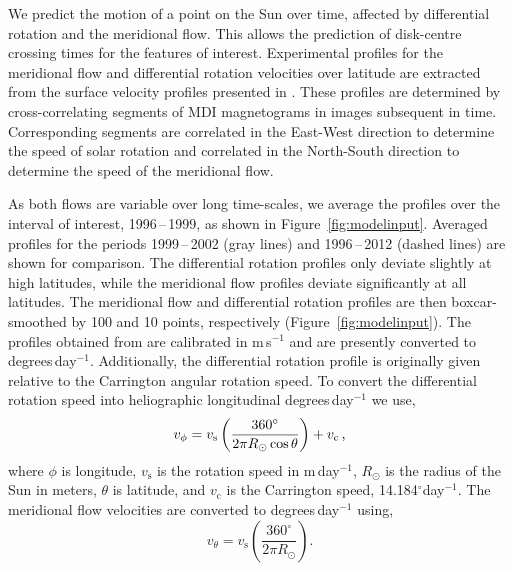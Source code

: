 We predict the motion of a point on the Sun over time, affected by differential rotation and the meridional flow. This allows the prediction of disk-centre crossing times for the features of interest.
Experimental profiles for the meridional flow and differential rotation velocities over latitude are extracted from the surface velocity profiles presented in \cite{Hathaway:2011}. These profiles are determined by cross-correlating segments of MDI magnetograms in images subsequent in time. Corresponding segments are correlated in the East-West direction to determine the speed of solar rotation and correlated in the North-South direction to determine the speed of the meridional flow.

As both flows are variable over long time-scales, we average the profiles over the interval of interest, 1996\,--\,1999, as shown in Figure~\ref{fig:modelinput}. Averaged profiles for the periods 1999\,--\,2002 (gray lines) and 1996\,--\,2012 (dashed lines) are shown for comparison. The differential rotation profiles only deviate slightly at high latitudes, while the meridional flow profiles deviate significantly at all latitudes. The meridional flow and differential rotation profiles are then boxcar-smoothed by 100 and 10 points, respectively (Figure~\ref{fig:modelinput}). The profiles obtained from \cite{Hathaway:2011} are calibrated in m\,s$^{-1}$ and are presently converted to degrees\,day$^{-1}$. Additionally, the differential rotation profile is originally given relative to the Carrington angular rotation speed. To convert the differential rotation speed into heliographic longitudinal degrees\,day$^{-1}$ we use,
\begin{equation}\label{eqn:convdiffrotdeg}
v_{\phi}=v_\mathrm{s} \left( \frac{360^{\circ}}{2 \pi R_{\odot} \cos{\theta}} \right) + v_{\mathrm{c}} \mbox{\,,}
\end{equation}
where $\phi$ is longitude, $v_\mathrm{s}$ is the rotation speed in m\,day$^{-1}$, $R_{\odot}$ is the radius of the Sun in meters, $\theta$ is latitude, and $v_{\mathrm{c}}$ is the Carrington speed, 14.184$^\circ$day$^{-1}$. The meridional flow velocities are converted to degrees\,day$^{-1}$ using,
\begin{equation}\label{eqn:convmeriddeg}
v_{\theta}=v_\mathrm{s} \left( \frac{360^{\circ}}{2 \pi R_{\odot}} \right) \mbox{.}
\end{equation}

\begin{table}
\caption[The elements of the discrete Laplacian operator kernel.]{The elements of the discrete Laplacian operator kernel. A 3$\times$3 array, with the values shown in the table, is convolved with an image to produce the discrete version of $\nabla^2$.}\label{table:lapker}
\end{table}

